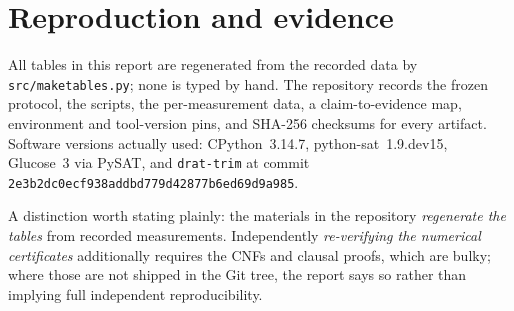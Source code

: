 \documentclass[11pt,a4paper]{article}
\theoremstyle{plain}
\theoremstyle{definition}
\theoremstyle{remark}
\begin{document}
\section*{Reproduction and evidence}

All tables in this report are regenerated from the recorded data by
\texttt{src/maketables.py}; none is typed by hand. The repository records the
frozen protocol, the scripts, the per-measurement data, a claim-to-evidence map,
environment and tool-version pins, and SHA-256 checksums for every artifact.
Software versions actually used: CPython~3.14.7, python-sat~1.9.dev15,
Glucose~3 via PySAT, and \texttt{drat-trim} at commit
\texttt{2e3b2dc0ecf938addbd779d42877b6ed69d9a985}.

A distinction worth stating plainly: the materials in the repository
\emph{regenerate the tables} from recorded measurements. Independently
\emph{re-verifying the numerical certificates} additionally requires the CNFs
and clausal proofs, which are bulky; where those are not shipped in the Git
tree, the report says so rather than implying full independent reproducibility.



\end{document}
